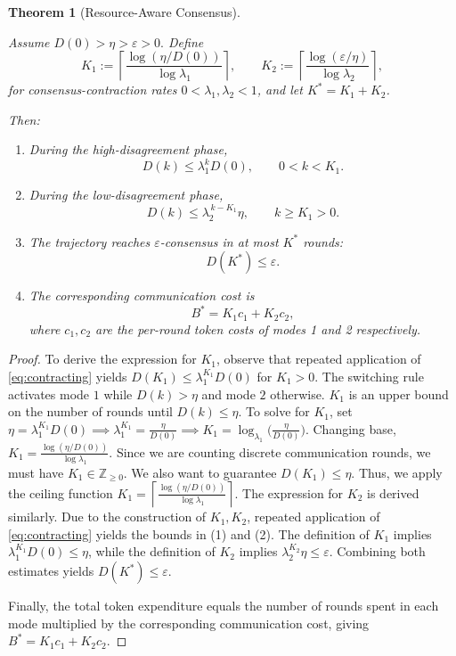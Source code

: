 \documentclass[10pt,a4paper]{amsart}
\newtheorem{theorem}{Theorem}
\begin{document}
\begin{theorem}[Resource-Aware Consensus]
\label{thm:rac}

Assume $ D(0)>\eta>\varepsilon>0.$ Define
\begin{equation}
K_1
:=
\left\lceil
\frac{\log(\eta/D(0))}
{\log\lambda_1}
\right\rceil,
\qquad
K_2
:=
\left\lceil
\frac{\log(\varepsilon/\eta)}
{\log\lambda_2}
\right\rceil,
\label{eq:Ks}
\end{equation}
for consensus-contraction rates $0< \lambda_1, \lambda_2 < 1 $,
and let $K^* = K_1+K_2$.


Then:

\begin{enumerate}
\item
During the high-disagreement phase,
\[
D(k)
\le
\lambda_1^kD(0),
\qquad
0< k < K_1.
\]

\item
During the low-disagreement phase,
\[
D(k)
\le
\lambda_2^{\,k-K_1}\eta,
\qquad
k\geq K_1>0.
\]

\item
The trajectory reaches
$\varepsilon$-consensus in at most $K^*$ rounds:
\[
D(K^*)
\le
\varepsilon.
\]

\item
The corresponding communication cost is
\[
B^*
=
K_1c_1+K_2c_2,
\] where $c_1,c_2$ are the per-round token costs of modes 1 and 2 respectively.
\end{enumerate}

\end{theorem}

\begin{proof}
To derive the expression for $K_1$, observe that repeated application of \eqref{eq:contracting} yields $D(K_1) \leq \lambda_1^{K_1}D(0)$ for $K_1 > 0.$
The switching rule activates mode $1$ while
$D(k)>\eta$ and mode $2$ otherwise.
$K_1$ is an upper bound on the number of rounds until $D(k) \leq \eta$. To solve for $K_1$, set $\eta = \lambda_1^{K_1}D(0) \implies \lambda_1^{K_1} = \frac{\eta}{D(0)} \implies K_1 = \log_{\lambda_1}\Big(\frac{\eta}{D(0)} \Big)$. Changing base, $K_1 = \frac{\log (\eta / D(0))}{\log \lambda_1}$. Since we are counting discrete communication rounds, we must have $K_1 \in \mathbb{Z}_{\geq 0}$. We also want to guarantee $D(K_1) \leq \eta $. Thus, we apply the ceiling function $K_1
=
\left\lceil
\frac{\log(\eta/D(0))}
{\log\lambda_1}
\right\rceil.$
The expression for $K_2$ is derived similarly. Due to the construction of $K_1,K_2$, repeated application of \eqref{eq:contracting} yields the bounds in (1) and (2).  The definition of $K_1$ implies
$ \lambda_1^{K_1}D(0)\le\eta$, while the definition of $K_2$ implies $ \lambda_2^{K_2}\eta\le\varepsilon$.
Combining both estimates yields $D(K^*)\le\varepsilon$.

Finally, the total token expenditure equals the number of rounds
spent in each mode multiplied by the corresponding communication cost,
giving $B^*=K_1c_1+K_2c_2$.

\end{proof}
\end{document}
